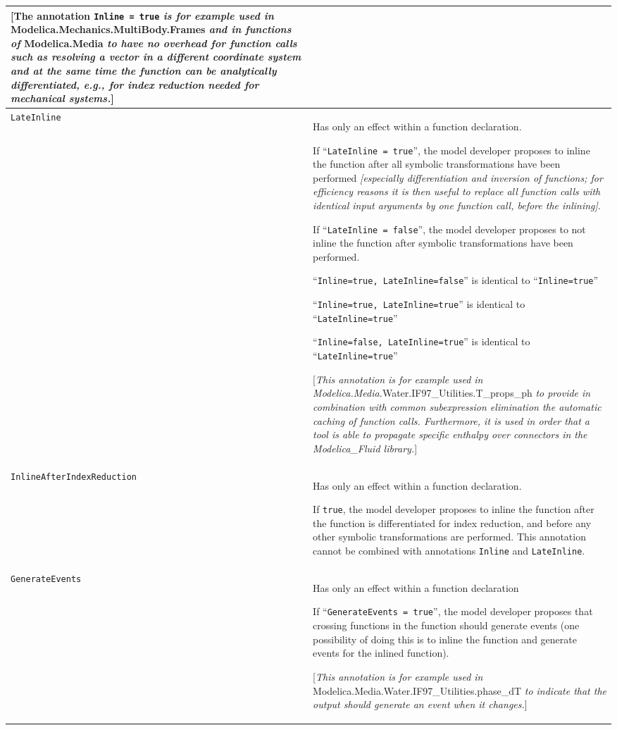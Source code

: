 \begin{longtable}[]{|p{4.2cm}|p{10cm}|}
{[}The annotation \lstinline!Inline = true! \emph{is for example used in}
Modelica\allowbreak{}.Mechanics\allowbreak{}.MultiBody\allowbreak{}.Frames \emph{and in functions of}
Modelica\allowbreak{}.Media \emph{to have no overhead for function calls such as
resolving a vector in a different coordinate system and at the same time
the function can be analytically differentiated, e.g., for index
reduction needed for mechanical systems.}{]}\\ \hline
\lstinline!LateInline!
&
Has only an effect within a function declaration.

If ``\lstinline!LateInline = true!'', the model developer proposes to inline the
function after all symbolic transformations have been performed
\emph{{[}especially differentiation and inversion of functions; for
efficiency reasons it is then useful to replace all function calls with
identical input arguments by one function call, before the inlining{]}}.

If ``\lstinline!LateInline = false!'', the model developer proposes to not inline
the function after symbolic transformations have been performed.

``\lstinline!Inline=true, LateInline=false!'' is identical to ``\lstinline!Inline=true!''

``\lstinline!Inline=true, LateInline=true!'' is identical to ``\lstinline!LateInline=true!''

``\lstinline!Inline=false, LateInline=true!'' is identical to ``\lstinline!LateInline=true!''

{[}\emph{This annotation is for example used in
Modelica\allowbreak{}.Media\allowbreak{}.}Water\allowbreak{}.IF97\_Utilities\allowbreak{}.T\_props\_ph \emph{to provide in
combination with common subexpression elimination the automatic caching
of function calls. Furthermore, it is used in order that a tool is able
to propagate specific enthalpy over connectors in the Modelica\_Fluid
library.}{]}\\ \hline
\lstinline!InlineAfterIndexReduction!\strut
&
Has only an effect within a function declaration.

If \lstinline!true!, the model developer proposes to inline the function after the
function is differentiated for index reduction, and before any other
symbolic transformations are performed. This annotation cannot be
combined with annotations \lstinline!Inline! and \lstinline!LateInline!.
\\ \hline
\lstinline!GenerateEvents!\strut
&
Has only an effect within a function declaration

If ``\lstinline!GenerateEvents = true!'', the model developer proposes that crossing
functions in the function should generate events (one possibility of
doing this is to inline the function and generate events for the inlined
function).

{[}\emph{This annotation is for example used in}
Modelica\allowbreak{}.Media\allowbreak{}.Water\allowbreak{}.IF97\_Utilities.phase\_dT \emph{to indicate that
the output should generate an event when it changes.}{]}\\ \hline

\end{longtable}
